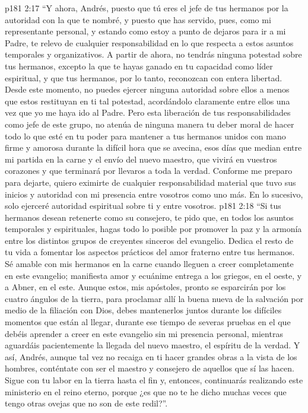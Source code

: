 \vs p181 2:17 “Y ahora, Andrés, puesto que tú eres el jefe de tus hermanos por la autoridad con la que te nombré, y puesto que has servido, pues, como mi representante personal, y estando como estoy a punto de dejaros para ir a mi Padre, te relevo de cualquier responsabilidad en lo que respecta a estos asuntos temporales y organizativos. A partir de ahora, no tendrás ninguna potestad sobre tus hermanos, excepto la que te hayas ganado en tu capacidad como líder espiritual, y que tus hermanos, por lo tanto, reconozcan con entera libertad. Desde este momento, no puedes ejercer ninguna autoridad sobre ellos a menos que estos restituyan en ti tal potestad, acordándolo claramente entre ellos una vez que yo me haya ido al Padre. Pero esta liberación de tus responsabilidades como jefe de este grupo, no atenúa de ninguna manera tu deber moral de hacer todo lo que esté en tu poder para mantener a tus hermanos unidos con mano firme y amorosa durante la difícil hora que se avecina, esos días que median entre mi partida en la carne y el envío del nuevo maestro, que vivirá en vuestros corazones y que terminará por llevaros a toda la verdad. Conforme me preparo para dejarte, quiero eximirte de cualquier responsabilidad material que tuvo sus inicios y autoridad con mi presencia entre vosotros como uno más. En lo sucesivo, solo ejerceré autoridad espiritual sobre ti y entre vosotros.
\vs p181 2:18 “Si tus hermanos desean retenerte como su consejero, te pido que, en todos los asuntos temporales y espirituales, hagas todo lo posible por promover la paz y la armonía entre los distintos grupos de creyentes sinceros del evangelio. Dedica el resto de tu vida a fomentar los aspectos prácticos del amor fraterno entre tus hermanos. Sé amable con mis hermanos en la carne cuando lleguen a creer completamente en este evangelio; manifiesta amor y ecuánime entrega a los griegos, en el oeste, y a Abner, en el este. Aunque estos, mis apóstoles, pronto se esparcirán por los cuatro ángulos de la tierra, para proclamar allí la buena nueva de la salvación por medio de la filiación con Dios, debes mantenerlos juntos durante los difíciles momentos que están al llegar, durante ese tiempo de severas pruebas en el que debéis aprender a creer en este evangelio sin mi presencia personal, mientras aguardáis pacientemente la llegada del nuevo maestro, el espíritu de la verdad. Y así, Andrés, aunque tal vez no recaiga en ti hacer grandes obras a la vista de los hombres, conténtate con ser el maestro y consejero de aquellos que sí las hacen. Sigue con tu labor en la tierra hasta el fin y, entonces, continuarás realizando este ministerio en el reino eterno, porque ¿es que no te he dicho muchas veces que tengo otras ovejas que no son de este redil?”.
